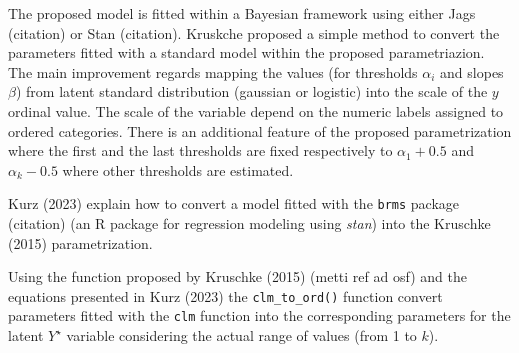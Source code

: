 \documentclass[
  man,floatsintext]{apa6}
\begin{document}
The proposed model is fitted within a Bayesian framework using either Jags (citation) or Stan (citation). Kruskche proposed a simple method to convert the parameters fitted with a standard model within the proposed parametriazion. The main improvement regards mapping the values (for thresholds \(\alpha_i\) and slopes \(\beta\)) from latent standard distribution (gaussian or logistic) into the scale of the \(y\) ordinal value. The scale of the variable depend on the numeric labels assigned to ordered categories. There is an additional feature of the proposed parametrization where the first and the last thresholds are fixed respectively to \(\alpha_1 + 0.5\) and \(\alpha_k - 0.5\) where other thresholds are estimated.

Kurz (2023) explain how to convert a model fitted with the \texttt{brms} package (citation) (an R package for regression modeling using \emph{stan}) into the Kruschke (2015) parametrization.

Using the function proposed by Kruschke (2015) (metti ref ad osf) and the equations presented in Kurz (2023) the \texttt{clm\_to\_ord()} function convert parameters fitted with the \texttt{clm} function into the corresponding parameters for the latent \(Y^\star\) variable considering the actual range of values (from 1 to \(k\)).
\end{document}

